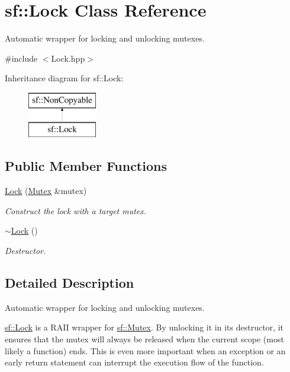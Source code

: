 \hypertarget{classsf_1_1_lock}{}\section{sf\+:\+:Lock Class Reference}
\label{classsf_1_1_lock}


Automatic wrapper for locking and unlocking mutexes.  




{\ttfamily \#include $<$Lock.\+hpp$>$}

Inheritance diagram for sf\+:\+:Lock\+:\begin{figure}[H]
\begin{center}
\leavevmode
\includegraphics[height=2.000000cm]{classsf_1_1_lock}
\end{center}
\end{figure}
\subsection*{Public Member Functions}
\begin{DoxyCompactItemize}
\item 
\hyperlink{classsf_1_1_lock_a1a4c5d7a15da61103d85c9aa7f118920}{Lock} (\hyperlink{classsf_1_1_mutex}{Mutex} \&mutex)
\begin{DoxyCompactList}\small\item\em Construct the lock with a target mutex. \end{DoxyCompactList}\item 
\hyperlink{classsf_1_1_lock_a8168b36323a18ccf5b6bc531d964aec5}{$\sim$\+Lock} ()
\begin{DoxyCompactList}\small\item\em Destructor. \end{DoxyCompactList}\end{DoxyCompactItemize}


\subsection{Detailed Description}
Automatic wrapper for locking and unlocking mutexes. 

\hyperlink{classsf_1_1_lock}{sf\+::\+Lock} is a R\+A\+II wrapper for \hyperlink{classsf_1_1_mutex}{sf\+::\+Mutex}. By unlocking it in its destructor, it ensures that the mutex will always be released when the current scope (most likely a function) ends. This is even more important when an exception or an early return statement can interrupt the execution flow of the function.

